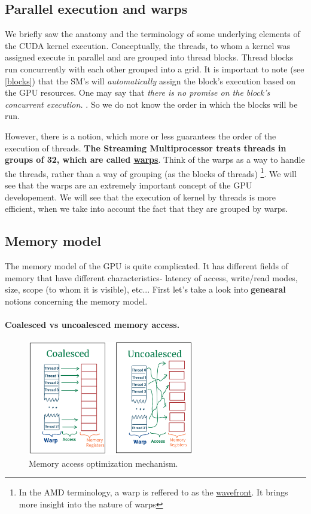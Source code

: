 \clearpage
\newpage
\subsection{Parallel execution and warps}
\label{warps}
We briefly saw the anatomy and the terminology of some underlying elements of the CUDA kernel execution.
Conceptually, the threads, to whom a kernel was assigned execute in parallel and are grouped into thread blocks.
Thread blocks run concurrently with each other grouped into a grid. It is important to note (see \autoref{blocks}) that 
the SM's will \textit{automatically} assign the block's execution based on the GPU resources. One may say that 
\textsl{
there is no promise on the block's concurrent execution.
}\cite{tuomanen2018hands}. So we do not know the order in which the blocks will be run.


However, there is a notion, which more or less guarantees the order of the execution of threads. 
\textbf{The Streaming Multiprocessor
treats threads in groups of 32, which are called \underline{warps}}. Think of the warps as a way to handle 
the threads, rather than 
a way of grouping (as the blocks of threads) \footnote{In the AMD terminology, a warp is reffered to as the 
\underline{wavefront}. It brings more insight into the nature of warps}.
We will see that the warps are an extremely important concept of the GPU developement. 
We will see that the execution of kernel by threads is more efficient, when we take into account the fact that 
they are grouped by warps.

\subsection{Memory model}
The memory model of the GPU is quite complicated. It has different fields of memory that have different characteristics-
latency of access, write/read modes, size, scope (to whom it is visible), etc... First let's take a look into \textbf{genearal}
notions concerning the memory model.
\vspace{-15pt}
\paragraph{Coalesced vs uncoalesced memory access.} 

\begin{figure}
      \vspace{-10pt}
      \centering
      \includegraphics[height=5cm]{pngs/coalesced.png}
   \caption{Memory access optimization mechanism.}
   \label{coalesced}
\end{figure}

